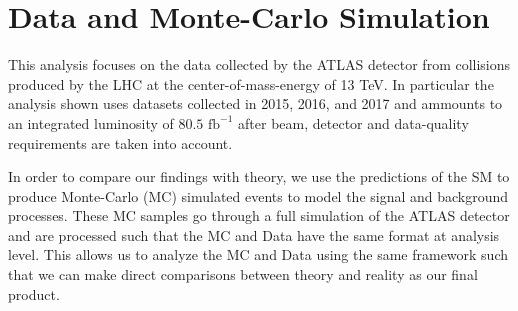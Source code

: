 \chapter{Data and Monte-Carlo Simulation} \label{chap:data}

This analysis focuses on the data collected by the ATLAS detector from \pp
collisions produced by the LHC at the center-of-mass-energy of 13 TeV.  In
particular the analysis shown uses datasets collected in 2015, 2016, and 2017
and ammounts to an integrated luminosity of $80.5 \text{ fb}^{-1}$ after beam,
detector and data-quality requirements are taken into account. 

In order to compare our findings with theory, we use the predictions of the SM
to produce Monte-Carlo (MC) simulated events to model the signal and background
processes.  These MC samples go through a full simulation of the ATLAS detector
and are processed such that the MC and Data have the same format at analysis
level. This allows us to analyze the MC and Data using the same framework such 
that we can make direct comparisons between theory and reality as our final product.




